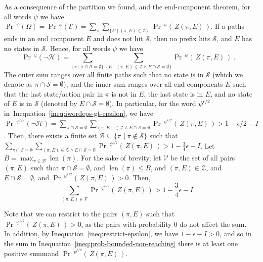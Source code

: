 \documentclass[final,3p,times,twocolumn]{elsarticle}
\theoremstyle{plain}
\theoremstyle{definition}
\newcommand{\reachset}{\mathcal{S}}
\newcommand{\fpath}{\pi}
\newcommand{\infimum}{I}
\newcommand{\pnhit}{\lnot\mathcal{H}}
\DeclareMathOperator{\lenWord}{len}
\newcommand{\len}[1]{\lenWord({#1})}
\newcommand{\iword}{\psi}
\DeclareMathOperator{\prWord}{Pr}
\newcommand{\recallInequation}[1]{Inequation~\ref{#1}}
\newcommand{\st}{\mid}
\newcommand{\iwordeps}{\iword^{\epsilon/2}}
\newcommand{\pr}{\prWord\,\!}
\begin{document}
As a consequence of the partition we found, and the end-component theorem, for
all words $\iword$ we have
$ \pr^{\iword}(\Omega)
= \pr^{\iword}(\mathcal{E})
= \sum_{\fpath} \sum_{\{ E \st (\fpath,E) \in \mathcal{Z} \}}
										\: \pr^{\iword}(\, Z(\fpath,E) \,)$.
If a paths ends in an end component $E$ and does not hit $\reachset$, then no
prefix hits $\reachset$, and $E$ has no states in $\reachset$. Hence, for all
words $\iword$ we have
\[ \pr^{\iword}(\pnhit) =
	\sum_{\{ \fpath \st \fpath \cap \reachset = \emptyset \}}
		\sum_{\{ E \st (\fpath,E) \in \mathcal{Z}
								\land E \cap \reachset = \emptyset \}}
			 	\pr^{\iword}(\, Z(\fpath,E) \,) \; . \]
The outer sum ranges over all finite paths such that no state is in $\reachset$
(which we denote as $\fpath \cap \reachset = \emptyset$), and the inner sum
ranges over all end components $E$ such that the last state/action pair in
$\fpath$ is not in $E$, the last state is in $E$, and no state of $E$ is in
$\reachset$ (denoted by $E \cap \reachset = \emptyset$). In particular, for the
word $\iwordeps$ in~\recallInequation{ineq:iwordeps-gt-epsilon}, we have
$\pr^{\iwordeps}(\pnhit) = \sum_{\fpath \cap \reachset = \emptyset}
			\sum_{(\fpath,E) \in \mathcal{Z} \land
					E \cap \reachset = \emptyset}
			\pr^{\iwordeps}(\, Z(\fpath,E) \,) > 1 - \epsilon/2 - \infimum$.
Then, there exists a finite set
$\mathcal{B} \subseteq \{ \fpath \st \fpath \not\in \reachset \}$ such that
$\sum_{\fpath \cap \reachset = \emptyset}
			\sum_{(\fpath,E) \in \mathcal{Z}
						\land E \cap \reachset = \emptyset}
			 	\pr^{\iwordeps}(\, Z(\fpath,E) \,) >
									1 - \frac{3}{4}\epsilon - \infimum$.
Let $B = \max_{\fpath \in \mathcal{B}} \len{\fpath}$. For the sake of brevity,
let $\mathcal{V}$ be the set of all pairs $(\fpath,E)$ such that
$\fpath \cap \reachset = \emptyset$, and $\len{\fpath} \leq B$, and
$(\fpath,E) \in \mathcal{Z}$, and $E \cap \reachset = \emptyset$, and
$\pr^{\iwordeps}(\, Z(\fpath,E) \,) > 0$. Then,
\begin{equation}
\label{ineq:prob-bounded-non-reaching}
\sum_{(\fpath,E) \in \mathcal{V}}
	\pr^{\iwordeps}(\, Z(\fpath,E) \,) > 1 - \frac{3}{4}\epsilon - \infimum \; .
\end{equation}

Note that we can restrict to the pairs $(\fpath,E)$ such that
$\pr^{\iwordeps}(\, Z(\fpath,E) \,) > 0$, as the pairs with probability $0$
do not affect the sum.
In addition, by \recallInequation{ineq:restrict-epsilon}, we have
$1 - \epsilon - \infimum > 0$, and so in the sum in
\recallInequation{ineq:prob-bounded-non-reaching} there is at least one
positive summand $\pr^{\iwordeps}(\, Z(\fpath,E) \,)$.
\end{document}
